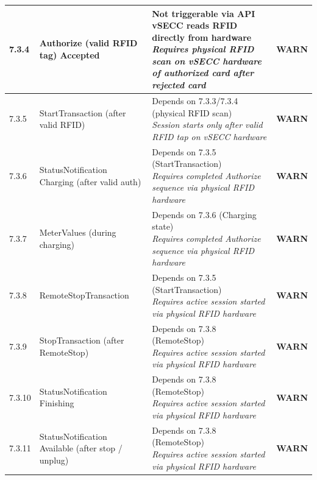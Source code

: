 \documentclass[10pt, a4paper]{article}
\begin{document}
\begin{longtable}{|L{1cm}|L{5.5cm}|M{7cm}|C{1.8cm}|}
\hline
\small 7.3.4 & \small Authorize (valid RFID tag)  Accepted & Not triggerable via API  vSECC reads RFID directly from hardware{\newline\normalfont\footnotesize\itshape Requires physical RFID scan on vSECC hardware of authorized card after rejected card} & \textcolor{warnorange}{\textbf{WARN}} \\
\hline
\small 7.3.5 & \small StartTransaction (after valid RFID) & Depends on 7.3.3/7.3.4 (physical RFID scan){\newline\normalfont\footnotesize\itshape Session starts only after valid RFID tap on vSECC hardware} & \textcolor{warnorange}{\textbf{WARN}} \\
\hline
\small 7.3.6 & \small StatusNotification Charging (after valid auth) & Depends on 7.3.5 (StartTransaction){\newline\normalfont\footnotesize\itshape Requires completed Authorize sequence via physical RFID hardware} & \textcolor{warnorange}{\textbf{WARN}} \\
\hline
\small 7.3.7 & \small MeterValues (during charging) & Depends on 7.3.6 (Charging state){\newline\normalfont\footnotesize\itshape Requires completed Authorize sequence via physical RFID hardware} & \textcolor{warnorange}{\textbf{WARN}} \\
\hline
\small 7.3.8 & \small RemoteStopTransaction & Depends on 7.3.5 (StartTransaction){\newline\normalfont\footnotesize\itshape Requires active session started via physical RFID hardware} & \textcolor{warnorange}{\textbf{WARN}} \\
\hline
\small 7.3.9 & \small StopTransaction (after RemoteStop) & Depends on 7.3.8 (RemoteStop){\newline\normalfont\footnotesize\itshape Requires active session started via physical RFID hardware} & \textcolor{warnorange}{\textbf{WARN}} \\
\hline
\small 7.3.10 & \small StatusNotification Finishing & Depends on 7.3.8 (RemoteStop){\newline\normalfont\footnotesize\itshape Requires active session started via physical RFID hardware} & \textcolor{warnorange}{\textbf{WARN}} \\
\hline
\small 7.3.11 & \small StatusNotification Available (after stop / unplug) & Depends on 7.3.8 (RemoteStop){\newline\normalfont\footnotesize\itshape Requires active session started via physical RFID hardware} & \textcolor{warnorange}{\textbf{WARN}} \\

\end{longtable}
\end{document}
